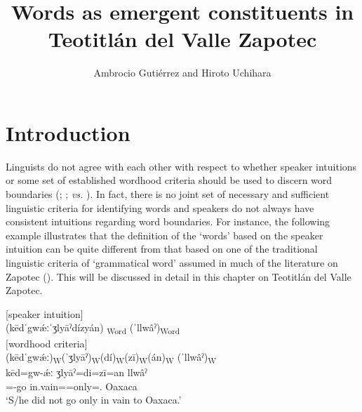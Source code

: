 \documentclass[output=paper]{langscibook}
\author{Ambrocio Gutiérrez\affiliation{University of Colorado Boulder} and Hiroto Uchihara\affiliation{Tokyo University of Foreign Studies} }
\title{Words as emergent constituents in Teotitlán del Valle Zapotec}
\begin{document}
\maketitle 

\section{Introduction}

Linguists do not agree with each other with respect to whether speaker intuitions or some set of established wordhood criteria should be used to discern word boundaries (\citealt[33-34]{Sapir1921}; \citealt[36]{Aronoff2005}; \citealt[74]{Mithun2014} \textit{vs.} \citealt{Bloomfield1914}). In fact, there is no joint set of necessary and sufficient linguistic criteria for identifying words \citep{Haspelmath2011} and speakers do not always have consistent intuitions regarding word boundaries. For instance, the following example illustrates that the definition of the `words' based on the speaker intuition  can be quite different from that based on one of the traditional linguistic criteria  of `grammatical word' assumed in much of the literature on Zapotec (\citealt{Broadwell2000,Munro2004,Beam-de-Azcona2016}). This will be discussed in detail in this chapter on Teotitlán del Valle Zapotec.


\ea\label{ex:key:zap:1} 
    \ea \label{ex:key:zap:1a}{{[speaker intuition]} \\
     (kēdˈgwǽːˈʒlyāˀdízyán) \textsubscript{Word}   (ˈllwâˀ)\textsubscript{Word} \\
         }   
     \ex \label{ex:key:zap:1b} { $[$wordhood criteria$]$ \\
        (kēdˈgwǽː)\textsubscript{W}(ˈʒlyāˀ)\textsubscript{W}(dí)\textsubscript{W}(zī)\textsubscript{W}(án)\textsubscript{W} (ˈllwâˀ)\textsubscript{W} \\
       \gll  kēd=gw-ǽː ʒlyāˀ=di=zī=an llwâˀ\\
       \Neg=\Compl{}-go in.vain=\Neg=only=\Third\Sg.\Inf{} Oaxaca \\ 
       \glt   `S/he did not go only in vain to Oaxaca.'
       }
      \z
\z 

\end{document}
